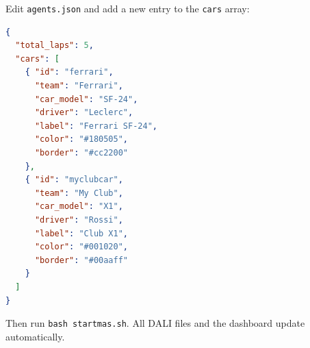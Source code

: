 Edit \texttt{agents.json} and add a new entry to the \texttt{cars} array:

\begin{lstlisting}[language={json}]
{
  "total_laps": 5,
  "cars": [
    { "id": "ferrari",   
      "team": "Ferrari",  
      "car_model": "SF-24",
      "driver": "Leclerc", 
      "label": "Ferrari SF-24",
      "color": "#180505", 
      "border": "#cc2200" 
    },
    { "id": "myclubcar", 
      "team": "My Club",  
      "car_model": "X1",
      "driver": "Rossi",   
      "label": "Club X1",
      "color": "#001020", 
      "border": "#00aaff" 
    }
  ]
}
\end{lstlisting}

\noindent
Then run \texttt{bash startmas.sh}. All DALI files and the dashboard update automatically.
